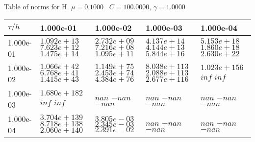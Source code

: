 \begin{center}
Table of norms for H. $\mu = 0.1000$ \, $C = 100.0000$, $\gamma = 1.0000$
  
\begin{tabular}{|p{1in}|p{1in}|p{1in}|p{1in}|p{1in}|} \hline
$\tau / h$ &1.000e-01 &1.000e-02 &1.000e-03 &1.000e-04 \\ \hline 
1.000e-01 & $1.092e+13$  $7.623e+12$  $1.475e+14$  & $2.732e+09$  $7.216e+08$  $1.095e+11$  & $4.137e+14$  $4.144e+13$  $5.844e+16$  & $5.153e+18$  $1.860e+18$  $2.630e+22$  \\ \hline 
1.000e-02 & $1.066e+42$  $6.768e+41$  $1.415e+43$  & $1.149e+75$  $2.453e+74$  $4.384e+76$  & $8.038e+113$  $2.088e+113$  $2.677e+116$  & $1.023e+156$  $inf$  $inf$  \\ \hline 
1.000e-03 & $1.680e+182$  $inf$  $inf$  & $nan$  $-nan$  $-nan$  & $nan$  $-nan$  $-nan$  & $nan$  $-nan$  $-nan$  \\ \hline 
1.000e-04 & $3.704e+139$  $8.718e+138$  $2.060e+140$  & $3.805e-03$  $2.345e-03$  $2.391e-02$  & $nan$  $-nan$  $-nan$  & $nan$  $-nan$  $-nan$  \\ \hline 

\end{tabular}\\[20pt]
\end{center}
